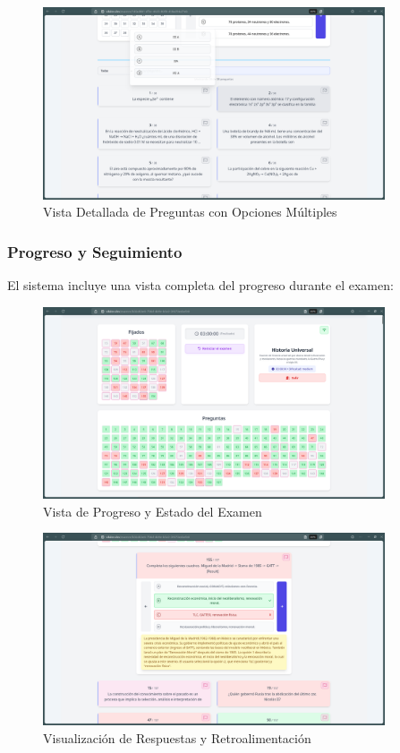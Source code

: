 \documentclass[12pt,a4paper]{report}
\begin{document}
\begin{figure}[h]
\centering
\includegraphics[width=0.9\textwidth]{250617_06h47m26s_screenshot.png}
\caption{Vista Detallada de Preguntas con Opciones Múltiples}
\label{fig:preguntas_detalle}
\end{figure}

\subsubsection{Progreso y Seguimiento}
El sistema incluye una vista completa del progreso durante el examen:

\begin{figure}[h]
\centering
\includegraphics[width=0.9\textwidth]{250617_06h48m58s_screenshot.png}
\caption{Vista de Progreso y Estado del Examen}
\label{fig:progreso_examen}
\end{figure}

\begin{figure}[h]
\centering
\includegraphics[width=0.9\textwidth]{250617_06h49m09s_screenshot.png}
\caption{Visualización de Respuestas y Retroalimentación}
\label{fig:respuestas_feedback}
\end{figure}
\end{document}
